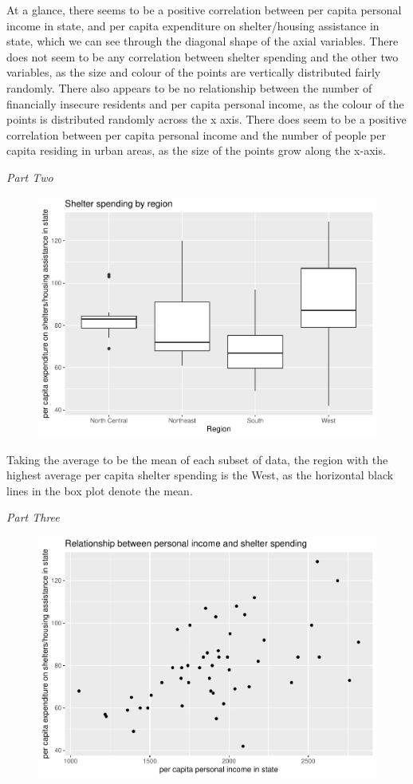 \documentclass[12pt,letterpaper]{article}
\begin{document}
\noindent At a glance, there seems to be a positive correlation between per capita personal income in state, and per capita expenditure on shelter/housing assistance in state, which we can see through the diagonal shape of the axial variables. There does not seem to be any correlation between shelter spending and the other two variables, as the size and colour of the points are vertically distributed fairly randomly. There also appears to be no relationship between the number of financially insecure residents and per capita personal income, as the colour of the points is distributed randomly across the x axis. There does seem to be a positive correlation between per capita personal income and the number of people per capita residing in urban areas, as the size of the points grow along the x-axis.\\

\clearpage

\textit{Part Two}\\

\begin{figure}[h!]\centering
	\label{fig:plot_1}
	\includegraphics[width=.75\textwidth]{Plot 2.pdf}
\end{figure}

\noindent Taking the average to be the mean of each subset of data, the region with the highest average per capita shelter spending is the West, as the horizontal black lines in the box plot denote the mean.

\clearpage



\textit{Part Three}\\

\begin{figure}[h!]\centering
	\label{fig:plot_1}
	\includegraphics[width=.70\textwidth]{Plot 3.pdf}
\end{figure}
\end{document}
